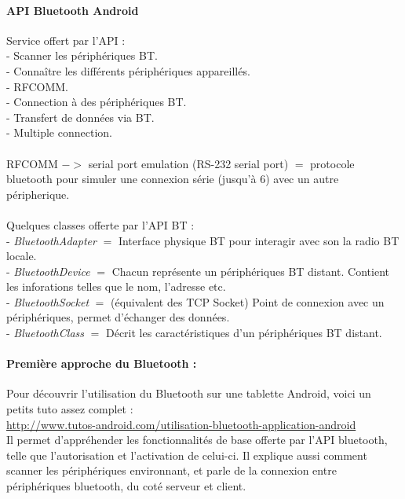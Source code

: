 \documentclass[a4paper,10pt]{article}
\begin{document}
	\paragraph{API Bluetooth Android}
	Service offert par l'API : \\
		- Scanner les périphériques BT. \\
		- Connaître les différents périphériques appareillés. \\
		- RFCOMM. \\
		- Connection à des périphériques BT. \\
		- Transfert de données via BT. \\
		- Multiple connection. \\\\
	RFCOMM $->$ serial port emulation (RS-232 serial port) $=$ protocole bluetooth pour simuler une connexion série (jusqu'à 6) avec un autre péripherique.\\\\
	Quelques classes offerte par l'API BT : \\
	- \textit{BluetoothAdapter} $=$ Interface physique BT pour interagir avec son la radio BT locale. \\
	- \textit{BluetoothDevice} $=$ Chacun représente un périphériques BT distant. Contient les inforations telles que le nom, l'adresse etc. \\
	- \textit{BluetoothSocket} $=$ (équivalent des TCP Socket) Point de connexion avec un périphériques, permet d'échanger des données. \\
	- \textit{BluetoothClass} $=$ Décrit les caractéristiques d'un périphériques BT distant. \\
	\paragraph{Première approche du Bluetooth : \\}
	Pour découvrir l'utilisation du Bluetooth sur une tablette Android, voici un petits tuto assez complet : \\
	\url{http://www.tutos-android.com/utilisation-bluetooth-application-android} \\
	Il permet d'appréhender les fonctionnalités de base offerte par l'API bluetooth, telle que l'autorisation et l'activation de celui-ci. Il explique aussi comment scanner les périphériques environnant, et parle de la connexion entre périphériques bluetooth, du coté serveur et client.
	
\end{document}
